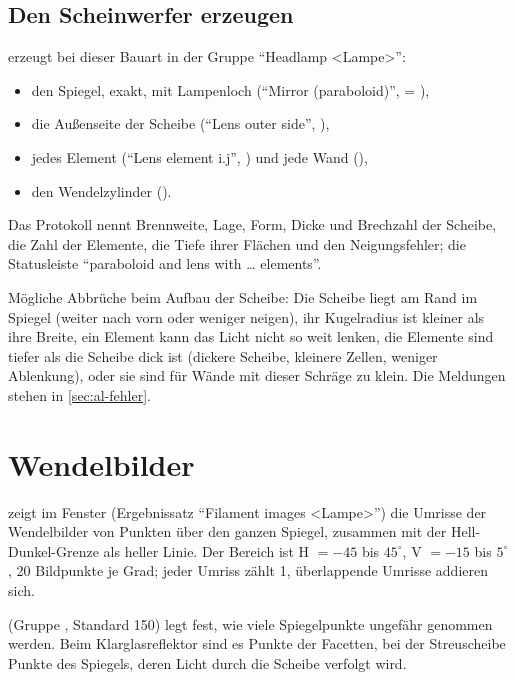 \subsection{Den Scheinwerfer erzeugen}

 erzeugt bei dieser Bauart in der Gruppe \enquote{Headlamp <Lampe>}:
\begin{itemize}
  \item den Spiegel, exakt, mit Lampenloch (\enquote{Mirror (paraboloid)},  =
    ),
  \item die Außenseite der Scheibe (\enquote{Lens outer side}, ),
  \item jedes Element (\enquote{Lens element i.j}, ) und jede Wand (),
  \item den Wendelzylinder ().
\end{itemize}

Das Protokoll nennt Brennweite, Lage, Form, Dicke und Brechzahl der Scheibe, die Zahl der Elemente,
die Tiefe ihrer Flächen und den Neigungsfehler; die Statusleiste \enquote{paraboloid and lens with …
elements}.

\begin{hinweis}
Mögliche Abbrüche beim Aufbau der Scheibe: Die Scheibe liegt am Rand im Spiegel (weiter nach vorn
oder weniger neigen), ihr Kugelradius ist kleiner als ihre Breite, ein Element kann das Licht nicht so
weit lenken, die Elemente sind tiefer als die Scheibe dick ist (dickere Scheibe, kleinere Zellen,
weniger Ablenkung), oder sie sind für Wände mit dieser Schräge zu klein. Die Meldungen stehen in
\autoref{sec:al-fehler}.
\end{hinweis}

\section{Wendelbilder}\label{sec:al-wendelbilder}

 zeigt im Fenster  (Ergebnissatz \enquote{Filament images <Lampe>}) die
Umrisse der Wendelbilder von Punkten über den ganzen Spiegel, zusammen mit der Hell-Dunkel-Grenze als
heller Linie. Der Bereich ist H $= -45$ bis $45^\circ$, V $= -15$ bis $5^\circ$, 20 Bildpunkte je
Grad; jeder Umriss zählt 1, überlappende Umrisse addieren sich.

 (Gruppe , Standard 150) legt fest, wie viele Spiegelpunkte
ungefähr genommen werden. Beim Klarglasreflektor sind es Punkte der Facetten, bei der Streuscheibe
Punkte des Spiegels, deren Licht durch die Scheibe verfolgt wird.

